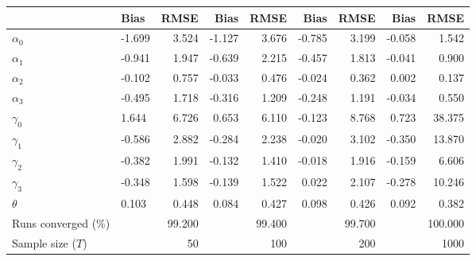 
\begin{tabular}[t]{llrrrrrrr}
\toprule
  & Bias & RMSE & Bias & RMSE & Bias & RMSE & Bias & RMSE\\
\midrule
$\alpha_{0}$ & -1.699 & 3.524 & -1.127 & 3.676 & -0.785 & 3.199 & -0.058 & 1.542\\
$\alpha_{1}$ & -0.941 & 1.947 & -0.639 & 2.215 & -0.457 & 1.813 & -0.041 & 0.900\\
$\alpha_{2}$ & -0.102 & 0.757 & -0.033 & 0.476 & -0.024 & 0.362 & 0.002 & 0.137\\
$\alpha_{3}$ & -0.495 & 1.718 & -0.316 & 1.209 & -0.248 & 1.191 & -0.034 & 0.550\\
$\gamma_{0}$ & 1.644 & 6.726 & 0.653 & 6.110 & -0.123 & 8.768 & 0.723 & 38.375\\
$\gamma_{1}$ & -0.586 & 2.882 & -0.284 & 2.238 & -0.020 & 3.102 & -0.350 & 13.870\\
$\gamma_{2}$ & -0.382 & 1.991 & -0.132 & 1.410 & -0.018 & 1.916 & -0.159 & 6.606\\
$\gamma_{3}$ & -0.348 & 1.598 & -0.139 & 1.522 & 0.022 & 2.107 & -0.278 & 10.246\\
$\theta$ & 0.103 & 0.448 & 0.084 & 0.427 & 0.098 & 0.426 & 0.092 & 0.382\\
Runs converged (\%) &  & 99.200 &  & 99.400 &  & 99.700 &  & 100.000\\
Sample size ($T$) &  & 50 &  & 100 &  & 200 &  & 1000\\
\bottomrule
\end{tabular}
